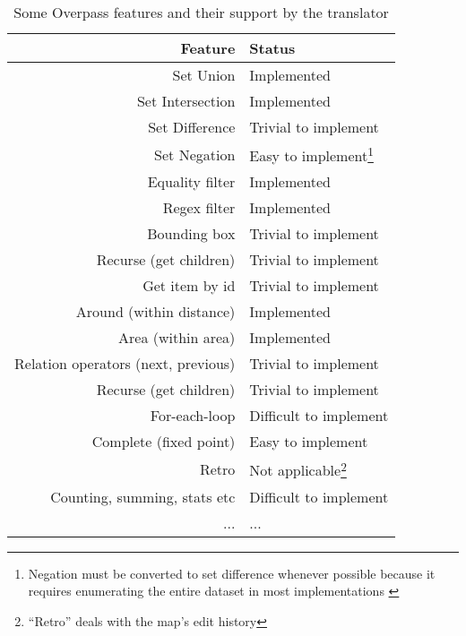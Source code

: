 \documentclass[main.tex]{subfiles}
\begin{document}
\begin{samepage}
\begin{table}
    \begin{center}
        \begin{tabular}{|r|l|}
            \hline
            Feature & Status \\
            \hline
            Set Union & Implemented \\
            Set Intersection & Implemented \\
            Set Difference & Trivial to implement \\
            Set Negation & Easy to implement\footnote{
                Negation must be converted to set difference whenever possible
                because it requires enumerating the entire dataset in most
                implementations \cite{overpass}
            }    \\
            Equality filter & Implemented \\
            Regex filter & Implemented \\
            Bounding box & Trivial to implement \\
            Recurse (get children) & Trivial to implement \\
            Get item by id & Trivial to implement \\
            Around (within distance) & Implemented \\
            Area (within area) & Implemented \\
            Relation operators (next, previous) & Trivial to implement \\
            Recurse (get children) & Trivial to implement \\
            For-each-loop & Difficult to implement \\
            Complete (fixed point) & Easy to implement \\
            Retro & Not applicable\footnote{``Retro'' deals with the map's edit
                history} \\
            Counting, summing, stats etc & Difficult to implement \\
            ... & ... \\
            \hline 
        \end{tabular}
    \end{center}
    \caption{Some Overpass features and their support by the translator}
    \label{table:overpassfeatures}
\end{table}
\end{samepage}
\end{document}
